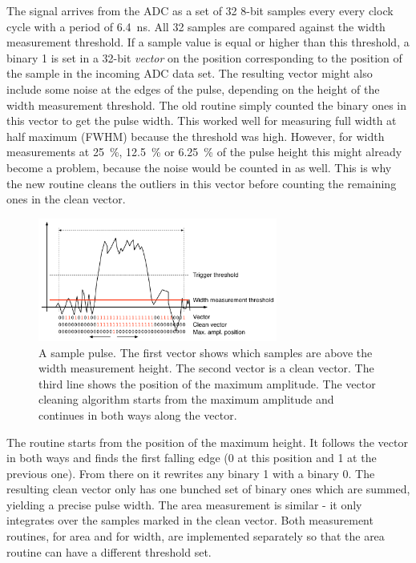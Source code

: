 \documentclass[12pt]{packages/mytustyle}  %
\begin{document}
The signal arrives from the ADC as a set of 32 8-bit samples every every clock cycle with a period of 6.4~ns. All 32 samples are compared against the width measurement threshold. If a sample value is equal or higher than this threshold, a binary 1 is set in a 32-bit \emph{vector} on the position corresponding to the position of the sample in the incoming ADC data set. The resulting vector might also include some noise at the edges of the pulse, depending on the height of the width measurement threshold. The old routine simply counted the binary ones in this vector to get the pulse width. This worked well for measuring full width at half maximum (FWHM) because the threshold was high. However, for width measurements at 25~\%, 12.5~\% or 6.25~\% of the pulse height this might already become a problem, because the noise would be counted in as well. This is why the new routine cleans the outliers in this vector before counting the remaining ones in the clean vector. 

\begin{figure}[!ht]
\centering
\includegraphics[width=0.7\textwidth]{plots/pulse1}
\caption{A sample pulse. The first vector shows which samples are above the width measurement height. The second vector is a clean vector. The third line shows the position of the maximum amplitude. The vector cleaning algorithm starts from the maximum amplitude and continues in both ways along the vector.}
\label{fig:samplepulse}
\end{figure}

The routine starts from the position of the maximum height. It follows the vector in both ways and finds the first falling edge (0 at this position and 1 at the previous one). From there on it rewrites any binary 1 with a binary 0. The resulting clean vector only has one bunched set of binary ones which are summed, yielding a precise pulse width. The area measurement is similar - it only integrates over the samples marked in the clean vector. Both measurement routines, for area and for width, are implemented separately so that the area routine can have a different threshold set.
\end{document}
